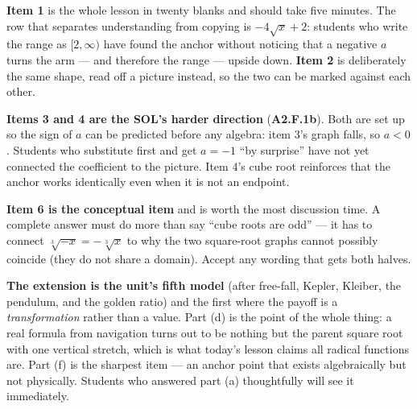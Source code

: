\documentclass[10pt]{article}
\begin{document}
\begin{teachernote}
\small
\textbf{Item 1} is the whole lesson in twenty blanks and should take five minutes. The row that
separates understanding from copying is $-4\sqrt{x}+2$: students who write the range as
$[2,\infty)$ have found the anchor without noticing that a negative $a$ turns the arm --- and
therefore the range --- upside down. \textbf{Item 2} is deliberately the same shape, read off a
picture instead, so the two can be marked against each other.

\textbf{Items 3 and 4 are the SOL's harder direction} (\textbf{A2.F.1b}). Both are set up so the sign
of $a$ can be predicted before any algebra: item 3's graph falls, so $a<0$. Students who substitute
first and get $a=-1$ ``by surprise'' have not yet connected the coefficient to the picture. Item 4's
cube root reinforces that the anchor works identically even when it is not an endpoint.

\textbf{Item 6 is the conceptual item} and is worth the most discussion time. A complete answer must
do more than say ``cube roots are odd'' --- it has to connect $\sqrt[3]{-x}=-\sqrt[3]{x}$ to why the
two square-root graphs cannot possibly coincide (they do not share a domain). Accept any wording
that gets both halves.

\textbf{The extension is the unit's fifth model} (after free-fall, Kepler, Kleiber, the pendulum, and
the golden ratio) and the first where the payoff is a \emph{transformation} rather than a value. Part
(d) is the point of the whole thing: a real formula from navigation turns out to be nothing but the
parent square root with one vertical stretch, which is what today's lesson claims all radical
functions are. Part (f) is the sharpest item --- an anchor point that exists algebraically but not
physically. Students who answered part (a) thoughtfully will see it immediately.
\end{teachernote}
\end{document}
